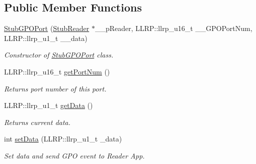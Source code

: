 \subsection*{Public Member Functions}
\begin{DoxyCompactItemize}
\item 
\hyperlink{class_e_l_f_i_n_1_1_stub_g_p_o_port_aef1a535a8ad9cbf0e4e8026855505b0e}{Stub\-G\-P\-O\-Port} (\hyperlink{class_e_l_f_i_n_1_1_stub_reader}{Stub\-Reader} $\ast$\-\_\-\-\_\-p\-Reader, L\-L\-R\-P\-::llrp\-\_\-u16\-\_\-t \-\_\-\-\_\-\-G\-P\-O\-Port\-Num, L\-L\-R\-P\-::llrp\-\_\-u1\-\_\-t \-\_\-\-\_\-data)
\begin{DoxyCompactList}\small\item\em Constructor of \hyperlink{class_e_l_f_i_n_1_1_stub_g_p_o_port}{Stub\-G\-P\-O\-Port} class. \end{DoxyCompactList}\item 
L\-L\-R\-P\-::llrp\-\_\-u16\-\_\-t \hyperlink{class_e_l_f_i_n_1_1_stub_g_p_o_port_afda8ce42f6702ecfc248aafb27ab5e37}{get\-Port\-Num} ()
\begin{DoxyCompactList}\small\item\em Returns port number of this port. \end{DoxyCompactList}\item 
L\-L\-R\-P\-::llrp\-\_\-u1\-\_\-t \hyperlink{class_e_l_f_i_n_1_1_stub_g_p_o_port_a5c5ccbd9fcd2acffb27224e6511fa8d4}{get\-Data} ()
\begin{DoxyCompactList}\small\item\em Returns current data. \end{DoxyCompactList}\item 
int \hyperlink{class_e_l_f_i_n_1_1_stub_g_p_o_port_a7ef2a70f60a5b17a313ba3db04ddf0ce}{set\-Data} (L\-L\-R\-P\-::llrp\-\_\-u1\-\_\-t \-\_\-data)
\begin{DoxyCompactList}\small\item\em Set data and send G\-P\-O event to Reader App. \end{DoxyCompactList}\end{DoxyCompactItemize}
